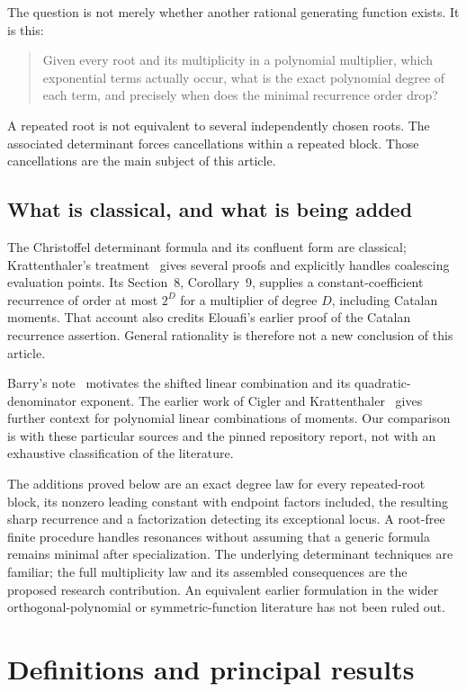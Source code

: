 \documentclass[11pt,a4paper]{article}
\numberwithin{equation}{section}
\theoremstyle{definition}
\theoremstyle{remark}
\begin{document}
The question is not merely whether another rational generating function
exists.  It is this:
\begin{quote}
Given every root and its multiplicity in a polynomial multiplier, which
exponential terms actually occur, what is the exact polynomial degree
of each term, and precisely when does the minimal recurrence order drop?
\end{quote}
A repeated root is not equivalent to several independently chosen roots.
The associated determinant forces cancellations within a repeated block.
Those cancellations are the main subject of this article.

\subsection{What is classical, and what is being added}
The Christoffel determinant formula and its confluent form are classical;
Krattenthaler's treatment~\cite{Krattenthaler2023} gives several proofs and explicitly
handles coalescing evaluation points.  Its Section~8, Corollary~9, supplies
a constant-coefficient recurrence of order at most $2^D$ for a multiplier
of degree $D$, including Catalan moments.  That account also credits
Elouafi's earlier proof of the Catalan recurrence assertion.  General
rationality is therefore not a new conclusion of this article.

Barry's note~\cite{Barry2020} motivates the shifted linear combination and
its quadratic-denominator exponent.  The earlier work of Cigler and
Krattenthaler~\cite{CiglerKratt2021} gives further context for polynomial
linear combinations of moments.  Our comparison is with these particular
sources and the pinned repository report, not with an exhaustive
classification of the literature.

The additions proved below are an exact degree law for every repeated-root
block, its nonzero leading constant with endpoint factors included, the
resulting sharp recurrence and a factorization detecting its exceptional
locus.  A root-free finite procedure handles resonances without assuming
that a generic formula remains minimal after specialization.  The
underlying determinant techniques are familiar; the full multiplicity
law and its assembled consequences are the proposed research contribution.
An equivalent earlier formulation in the wider orthogonal-polynomial or
symmetric-function literature has not been ruled out.

\section{Definitions and principal results}\label{rc:sec:main}
\end{document}
